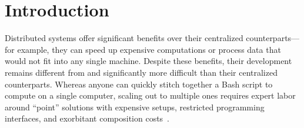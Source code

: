 \documentclass[sigplan,10pt,review,anonymous]{acmart}
\begin{document}




\maketitle


\section{Introduction}

% 

Distributed systems offer significant benefits over their centralized counterparts---for example, they can speed up expensive computations or process data that would not fit into any single machine.
Despite these benefits, their development remains different from and significantly more difficult than their centralized counterparts.
Whereas anyone can quickly stitch together a Bash script to compute on a single computer, 
   scaling out to multiple ones requires expert labor around ``point'' solutions with expensive setups, restricted programming interfaces, and exorbitant composition costs~\cite{taurus:14, dios:13, andromeda:15, pywren:17, futuredata:18, nefele:18}.
\end{document}
